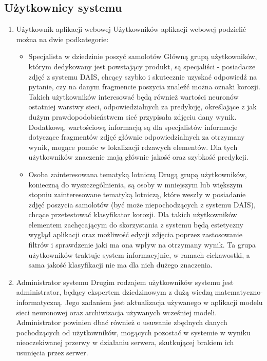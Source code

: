 \documentclass[polish,12pt]{aghthesis}
\begin{document}
\subsection{Użytkownicy systemu}
\begin{enumerate}
    \item Użytkownik aplikacji webowej
    \newline Użytkowników aplikacji webowej podzielić można na dwie podkategorie:
    \begin{itemize}[noitemsep,topsep=0pt]
        \item Specjalista w dziedzinie poszyć samolotów
        \newline Główną grupą użytkowników, którym dedykowany jest powstający produkt, są specjaliści - posiadacze zdjęć z systemu DAIS, chcący szybko i skutecznie uzyskać odpowiedź na pytanie, czy na danym fragmencie poszycia znaleźć można oznaki korozji. Takich użytkowników interesować będą również wartości neuronów ostatniej warstwy sieci, odpowiedzialnych za predykcję, określające z jak dużym prawdopodobieństwem sieć przypisała zdjęciu dany wynik. Dodatkową, wartościową informacją są dla specjalistów informacje dotyczące fragmentów zdjęć głównie odpowiedzialnych za otrzymany wynik, mogące pomóc w lokalizacji rdzawych elementów. Dla tych użytkowników znaczenie mają głównie jakość oraz szybkość predykcji.
        \item Osoba zainteresowana tematyką lotniczą
        \newline Drugą grupą użytkowników, konieczną do wyszczególnienia, są osoby w mniejszym lub większym stopniu zainteresowane tematyką lotniczą, które weszły w posiadanie zdjęć poszycia samolotów (być może niepochodzących z systemu DAIS), chcące przetestować klasyfikator korozji. Dla takich użytkowników elementem zachęcającym do skorzystania z systemu będą estetyczny wygląd aplikacji oraz możliwość edycji zdjęcia poprzez zastosowanie filtrów i sprawdzenie jaki ma ona wpływ na otrzymany wynik. Ta grupa użytkowników traktuje system informacyjnie, w ramach ciekawostki, a sama jakość klasyfikacji nie ma dla nich dużego znaczenia.
    \end{itemize}
    \item Administrator systemu
    \newline Drugim rodzajem użytkowników systemu jest administrator, będący ekspertem dziedzinowym z dużą wiedzą matematyczno-informatyczną. Jego zadaniem jest aktualizacja używanego w aplikacji modelu sieci neuronowej oraz archiwizacja używanych wcześniej modeli. Administrator powinien dbać również o usuwanie zbędnych danych pochodzących od użytkowników, mogących pozostać w systemie w wyniku nieoczekiwanej przerwy w działaniu serwera, skutkującej brakiem ich usunięcia przez serwer.
\end{enumerate}
\end{document}
